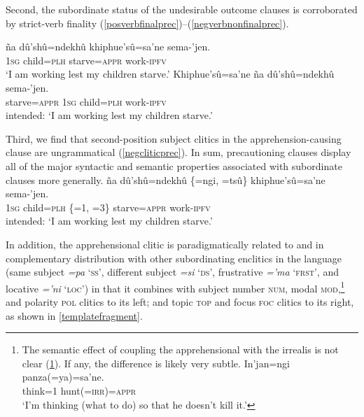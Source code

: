 \documentclass[output=paper,colorlinks,citecolor=brown]{langscibook}
\begin{document}
Second, the subordinate status of the undesirable outcome  clauses is corroborated by strict-verb finality (\ref{posverbfinalprec})--(\ref{negverbnonfinalprec}).
\begin{exe}
    \ex\label{posverbfinalprec}
    \gll {\ob}ña dû'shû=ndekhû {khiphue'sû=sa'ne{\cb}} sema-'jen.    \\
        \textsc{1sg} child=\textsc{plh}             {starve=\textsc{appr}}      work-\textsc{ipfv} \\
    \glt `I am working lest my children starve.'  
    \ex\label{negverbnonfinalprec}
    \gll \bad{\ob}Khiphue'sû=sa'ne ña {dû'shû=ndekhû{\cb}} sema-'jen.  \\
         starve=\textsc{appr}  \textsc{1sg}      {child=\textsc{plh}}           work-\textsc{ipfv} \\
    \glt intended: `I am working lest my children starve.'
\end{exe}

Third, we find that second-position subject clitics in the apprehension-causing clause are ungrammatical (\ref{negcliticprec}). In sum, precautioning  clauses display all of the major syntactic and semantic properties associated with  subordinate clauses more generally.
    \ea \label{negcliticprec}
    \gll \bad{\ob}ña dû'shû=ndekhû {\rm\{}=ngi, =tsû{\rm\}} {khiphue'sû=sa'ne{\cb}} sema-'jen.    \\
        \textsc{1sg} child=\textsc{plh} {\rm\{}\textsc{=}1, \textsc{=}3{\rm\}}   {starve=\textsc{appr}}      work-\textsc{ipfv} \\
    \glt intended: `I am working lest my children starve.'  
    \z

In addition, the apprehensional clitic  is paradigmatically related to and in complementary distribution with other subordinating enclitics in the language (same subject \emph{=pa} `\textsc{ss}', different subject \emph{=si} `\textsc{ds}', frustrative \emph{='ma} `\textsc{frst}', and locative \emph{='ni} `\textsc{loc}') in that it combines with subject number {\textsc{num},} modal {\textsc{mod},}\footnote{{The semantic effect of coupling the apprehensional  with the irrealis  is not clear (\ref{yasane}). If any, the difference is likely very subtle.}
    \ea \label{yasane}
    \gll In'jan=ngi panza\textup{(}=ya\textup{)}=sa'ne. \\
         think\textsc{=1} hunt(=\textsc{irr})\textsc{=appr}\\
    \glt `I'm thinking (what to do) so that he doesn't kill it.'
    \z 
} and polarity {\textsc{pol}} clitics to its left; and topic {\textsc{top}} and focus {\textsc{foc}} clitics to its right, as shown in \autoref{templatefragment}.
    
\end{document}
